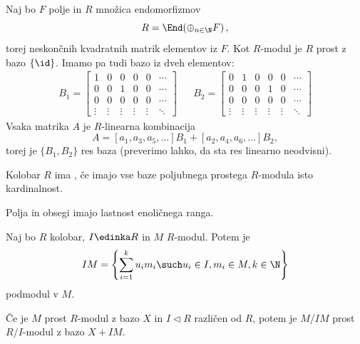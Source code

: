 \begin{primer}
  Naj bo $F$ polje in $R$ množica endomorfizmov
  \[
	R = \End\!\left( \oplus_{n \in \N} F \right),
  \]
  torej neskončnih kvadratnih matrik elementov iz $F$.
  Kot $R$-modul je $R$ prost z bazo $\{\id\}$.
  Imamo pa tudi bazo iz dveh elementov:
  \begin{align*}
	B_1 =
	\begin{bmatrix}
	  1 & 0 & 0 & 0 & 0 & \cdots \\
	  0 & 0 & 1 & 0 & 0 & \cdots \\
	  0 & 0 & 0 & 0 & 0 & \cdots \\
	  \vdots & \vdots & \vdots & \vdots & \vdots & \ddots
	\end{bmatrix}
	&& B_2 =
	   \begin{bmatrix}
		 0 & 1 & 0 & 0 & 0 & \cdots \\
		 0 & 0 & 0 & 1 & 0 & \cdots \\
		 0 & 0 & 0 & 0 & 0 & \cdots \\
		 \vdots & \vdots & \vdots & \vdots & \vdots & \ddots
	   \end{bmatrix}
  \end{align*}
  Vsaka matrika $A$ je $R$-linearna kombinacija
  \[
	A = [a_1, a_3, a_5, \ldots] B_1 + [a_2, a_4, a_6, \ldots] B_2,
  \]
  torej je $\{B_1, B_2\}$ res baza (preverimo lahko, da sta res linearno
  neodvisni).
\end{primer}

\begin{definicija}
  Kolobar $R$ ima , če imajo vse baze
  poljubnega prostega $R$-modula isto kardinalnost.
\end{definicija}


\begin{primer}
  Polja in obsegi imajo lastnost enoličnega ranga.
\end{primer}

\begin{definicija}
  Naj bo $R$ kolobar, $I \edinka R$ in $M$ $R$-modul.
  Potem je
  \[
	IM = \left\{ \sum_{i=1}^k u_i m_i \such u_i \in I, m_i \in M, k \in \N \right\}
  \]
  podmodul v $M$.
\end{definicija}

\begin{lema}
  Če je $M$ prost $R$-modul z bazo $X$ in $I \triangleleft R$ različen od $R$,
  potem je $M/IM$ prost $R/I$-modul z bazo $X + IM$.
\end{lema}

